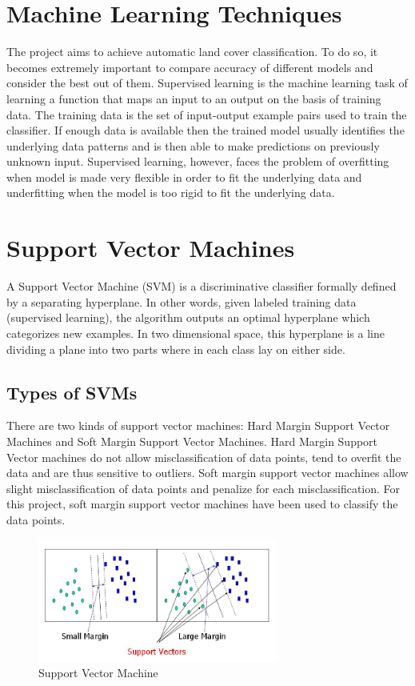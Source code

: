 \documentclass[12pt, a4paper]{report}
\begin{document}
\section{Machine Learning Techniques}
The project aims to achieve automatic land cover classification. To do so, it becomes extremely important to compare accuracy of different models and  consider the best out of them.
Supervised learning is the machine learning task of learning a function that maps an input to an output on the basis of training data.\cite{supervisedlearningone, supervisedlearningtwo} The training data is the set of input-output example pairs used to train the classifier. If enough data is available then the trained model usually identifies the underlying data patterns and is then able to make predictions on previously unknown input. Supervised learning, however, faces the problem of overfitting when model is made very flexible in order to fit the underlying data and underfitting when the model is too rigid to fit the underlying data.
\section{Support Vector Machines}
A Support Vector Machine (SVM) is a discriminative classifier formally defined by a separating hyperplane. In other words, given labeled training data (supervised learning), the algorithm outputs an optimal hyperplane which categorizes new examples. In two dimensional space, this hyperplane is a line dividing a plane into two parts where in each class lay on either side.\cite{supportvectormachines}
\subsection{Types of SVMs}
There are two kinds of support vector machines: Hard Margin Support Vector Machines and Soft Margin Support Vector Machines.
Hard Margin Support Vector machines do not allow misclassification of data points, tend to overfit the data and are thus sensitive to outliers. Soft margin support vector machines allow slight misclassification of data points and penalize for each misclassification.
For this project, soft margin support vector machines have been used to classify the data points.
\begin{figure}[h]
\centering
\includegraphics[width=0.7\textwidth]{supportvectormachines.jpg}
\caption{Support Vector Machine}
\end{figure}
\end{document}
